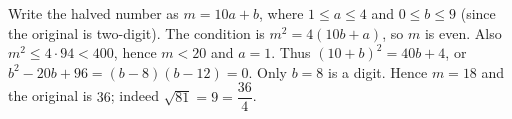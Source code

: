 Write the halved number as $m=10a+b$, where $1\le a\le4$ and $0\le b\le9$ (since the original is two-digit). The condition is $m^2=4(10b+a)$, so $m$ is even. Also $m^2\le4\cdot94<400$, hence $m<20$ and $a=1$. Thus $(10+b)^2=40b+4$, or $b^2-20b+96=(b-8)(b-12)=0$. Only $b=8$ is a digit. Hence $m=18$ and the original is $\boxed{36}$; indeed $\sqrt{81}=9=\dfrac{36}{4}$.
